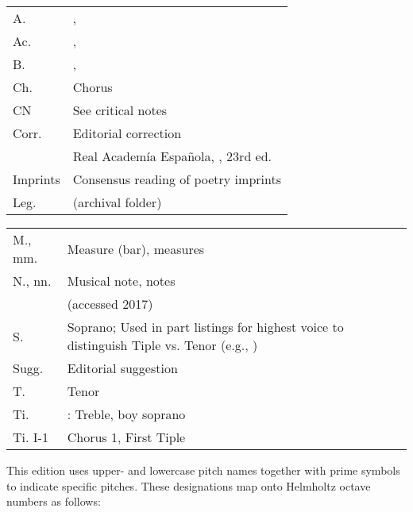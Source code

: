 
\begin{multicols}{2}
    \setlength{\parindent}{0pt}
    \begin{tabu} to \linewidth{lZ}
        A. & , \\
        Ac. & , \\
        B. & , \\
        Ch. & Chorus\\
        CN & See critical notes\\
        Corr. & Editorial correction\\
         & Real Academía Española, , 23rd ed.\\
        Imprints & Consensus reading of poetry imprints\\
        Leg. &  (archival folder)\\
    \end{tabu}

    \begin{tabu} to \linewidth{lZ}
        M., mm. & Measure (bar), measures\\
        N., nn. & Musical note, notes\\
         &  (accessed 2017)\\
        S. & Soprano; Used in part listings for highest voice to distinguish
        Tiple vs. Tenor (e.g., )\\
        Sugg. & Editorial suggestion\\
        T. & Tenor\\
        Ti. & : Treble, boy soprano\\
        Ti. I-1 & Chorus 1, First Tiple\\
    \end{tabu}
\end{multicols}



This edition uses upper- and lowercase pitch names together with prime symbols
to indicate specific pitches.
These designations map onto Helmholtz octave numbers as follows:




